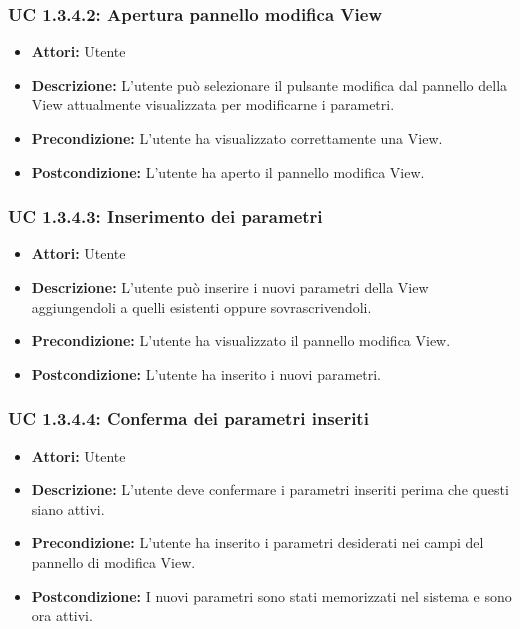 \subsubsection{UC 1.3.4.2: Apertura pannello modifica View}

\begin{itemize}
    \item \textbf{Attori:} Utente
    \item \textbf{Descrizione:} L'utente può selezionare il pulsante modifica dal pannello della View attualmente visualizzata per modificarne i parametri.
    \item \textbf{Precondizione:} L'utente ha visualizzato correttamente una View.
    \item \textbf{Postcondizione:} L'utente ha aperto il pannello modifica View.
\end{itemize}

\subsubsection{UC 1.3.4.3: Inserimento dei parametri}

\begin{itemize}
    \item \textbf{Attori:} Utente
    \item \textbf{Descrizione:} L'utente può inserire i nuovi parametri della View aggiungendoli a quelli esistenti oppure sovrascrivendoli.
    \item \textbf{Precondizione:} L'utente ha visualizzato il pannello modifica View.
    \item \textbf{Postcondizione:} L'utente ha inserito i nuovi parametri.
\end{itemize}

\subsubsection{UC 1.3.4.4: Conferma dei parametri inseriti}

\begin{itemize}
    \item \textbf{Attori:} Utente
    \item \textbf{Descrizione:} L'utente deve confermare i parametri inseriti perima che questi siano attivi.
    \item \textbf{Precondizione:} L'utente ha inserito i parametri desiderati nei campi del pannello di modifica View.
    \item \textbf{Postcondizione:} I nuovi parametri sono stati memorizzati nel sistema e sono ora attivi.
\end{itemize}

